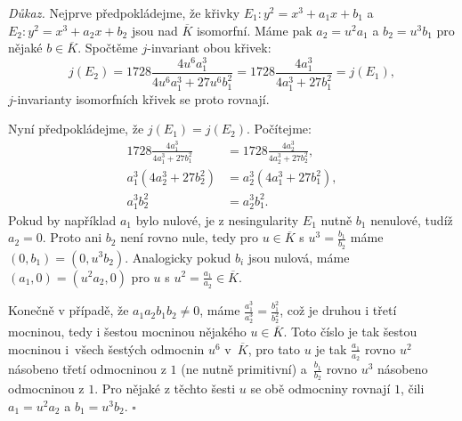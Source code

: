 \documentclass[12pt]{report}
\begin{document}
\noindent \textit{Důkaz. } Nejprve předpokládejme, že křivky $E_1: y^2 = x^3+a_1x+b_1$ a $E_2 : y^2 = x^3+a_2 x + b_2$ jsou nad $\overline{K}$ isomorfní. Máme pak $a_2 = u^2 a_1$ a $b_2 = u^3 b_1$ pro nějaké $b \in \overline{K}$. Spočtěme $j$-invariant obou křivek:
\begin{equation*}
j(E_2) = 1728 \frac{4 u^6 a_1^3}{4 u^6 a_1^3 + 27 u^6 b_1^2} = 1728 \frac{4 a_1^3}{4a_1^3 + 27 b_1^2} = j(E_1),
\end{equation*}
$j$-invarianty isomorfních křivek se proto rovnají.

Nyní předpokládejme, že $j(E_1) = j(E_2)$. Počítejme:
\begin{align*}
1728 \frac{4 a_1^3}{4 a_1^3 + 27 b_1^2} &= 1728 \frac{4 a_2^3}{4a_2^3 + 27 b_2^2},\\
a_1^3 (4 a_2^3 + 27b_2^2) &= a_2^3 (4a_1 ^3 + 27 b_1^2),\\
a_1^3 b_2^2 &= a_2^3 b_1^2.
\end{align*}
Pokud by například $a_1$ bylo nulové, je z nesingularity $E_1$ nutně $b_1$ nenulové, tudíž $a_2 = 0$. Proto ani $b_2$ není rovno nule, tedy pro $u \in \overline{K}$ s $u^3 = \frac{b_1}{b_2}$ máme $(0,b_1) = (0,u^3 b_2)$. Analogicky pokud $b_i$ jsou nulová, máme $(a_1,0) = (u^2 a_2,0)$ pro $u$ s $u^2  = \frac{a_1}{a_2} \in \overline{K}$.

Konečně v případě, že $a_1 a_2 b_1 b_2 \neq 0$, máme $\frac{a_1^3}{a_2^3} = \frac{b_1^2}{b_2^2}$, což je druhou i třetí mocninou, tedy i šestou mocninou nějakého $u \in \overline{K}$. Toto číslo je tak šestou mocninou i~všech šestých odmocnin $u^6$ v~$\overline{K}$, pro tato $u$ je tak $\frac{a_1}{a_2}$ rovno $u^2$ násobeno třetí odmocninou z $1$ (ne nutně primitivní) a~$\frac{b_1}{b_2}$ rovno $u^3$ násobeno odmocninou z $1$. Pro nějaké z těchto šesti $u$ se obě odmocniny rovnají $1$, čili $a_1 = u^2 a_2$ a $b_1 = u^3 b_2$. \hfill $\square$\\
\end{document}
